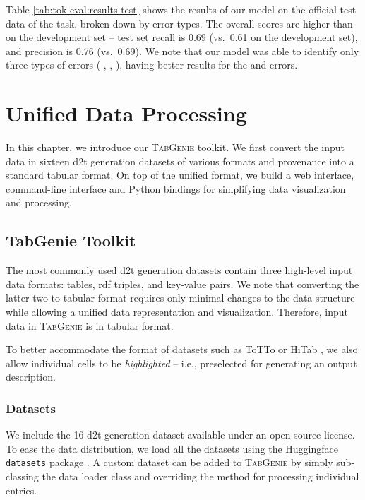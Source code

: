 \documentclass[12pt,notitlepage,a4paper,oneside,openany]{report}
\newcommand{\errnum}[1]{{\leavevmode\color{errblue} \underLine{\textbf{#1\textsuperscript{N}}}}}
\newcommand{\errent}[1]{{\leavevmode\color{errred} \underLine{\textbf{#1\textsuperscript{E}}}}}
\newcommand{\errword}[1]{{\leavevmode\color{errorange} \underLine{\textbf{#1\textsuperscript{W}}}}}
\renewcommand\cite{\citep}
\begin{document}
Table \ref{tab:tok-eval:results-test} shows the results of our model on the official test data of the task, broken down by error types. The overall scores are higher than on the development set -- test set recall is 0.69 (vs.~0.61 on the development set), and precision is 0.76 (vs.~0.69). We note that our model was able to identify only three types of errors (\errent{NAME}, \errnum{NUMBER}, \errword{WORD}), having better results for the \errent{NAME} and \errnum{NUMBER} errors.


\chapter{Unified Data Processing}
\label{chap:tabgenie}

In this chapter, we introduce our \textsc{TabGenie} toolkit. We first convert the input data in sixteen \ac{d2t} generation datasets of various formats and provenance into a standard tabular format. On top of the unified format, we build a web interface, command-line interface and Python bindings for simplifying data visualization and processing.

\section{TabGenie Toolkit}
\label{sec:tabgenie}
The most commonly used \ac{d2t} generation datasets contain three high-level input data formats: tables, \acs{rdf} triples, and key-value pairs. We note that converting the latter two to tabular format requires only minimal changes to the data structure while allowing a unified data representation and visualization.  Therefore, input data in \textsc{TabGenie} is in tabular format.

To better accommodate the format of datasets such as ToTTo \cite{parikhToTToControlledTableToText2020} or HiTab \cite{chengHiTabHierarchicalTable2021}, we also allow individual cells to be \textit{highlighted} -- i.e., preselected for generating an output description.

\subsection{Datasets}
We include the 16 \ac{d2t} generation dataset available under an open-source license. To ease the data distribution, we load all the datasets using the Huggingface \texttt{datasets} package \cite{lhoest2021datasets}. A custom dataset can be added to \textsc{TabGenie} by simply sub-classing the data loader class and overriding the method for processing individual entries.
\end{document}
